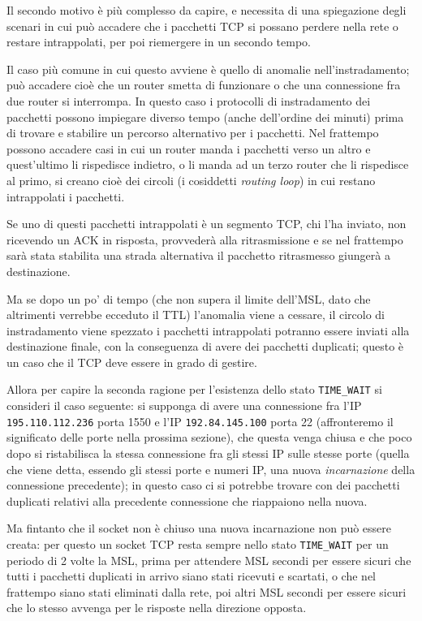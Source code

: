 Il secondo motivo è più complesso da capire, e necessita di una spiegazione
degli scenari in cui può accadere che i pacchetti TCP si possano perdere nella
rete o restare intrappolati, per poi riemergere in un secondo tempo. 

Il caso più comune in cui questo avviene è quello di anomalie
nell'instradamento; può accadere cioè che un router smetta di funzionare o che
una connessione fra due router si interrompa. In questo caso i protocolli di
instradamento dei pacchetti possono impiegare diverso tempo (anche dell'ordine
dei minuti) prima di trovare e stabilire un percorso alternativo per i
pacchetti. Nel frattempo possono accadere casi in cui un router manda i
pacchetti verso un altro e quest'ultimo li rispedisce indietro, o li manda ad
un terzo router che li rispedisce al primo, si creano cioè dei circoli (i
cosiddetti \textit{routing loop}) in cui restano intrappolati i pacchetti.

Se uno di questi pacchetti intrappolati è un segmento TCP, chi l'ha inviato,
non ricevendo un ACK in risposta, provvederà alla ritrasmissione e se nel
frattempo sarà stata stabilita una strada alternativa il pacchetto ritrasmesso
giungerà a destinazione.

Ma se dopo un po' di tempo (che non supera il limite dell'MSL, dato che
altrimenti verrebbe ecceduto il TTL) l'anomalia viene a cessare, il circolo di
instradamento viene spezzato i pacchetti intrappolati potranno essere inviati
alla destinazione finale, con la conseguenza di avere dei pacchetti duplicati;
questo è un caso che il TCP deve essere in grado di gestire.

Allora per capire la seconda ragione per l'esistenza dello stato
\texttt{TIME\_WAIT} si consideri il caso seguente: si supponga di avere una
connessione fra l'IP \texttt{195.110.112.236} porta 1550 e l'IP
\texttt{192.84.145.100} porta 22 (affronteremo il significato delle porte
nella prossima sezione), che questa venga chiusa e che poco dopo si
ristabilisca la stessa connessione fra gli stessi IP sulle stesse porte
(quella che viene detta, essendo gli stessi porte e numeri IP, una nuova
\textsl{incarnazione} della connessione precedente); in questo caso ci si
potrebbe trovare con dei pacchetti duplicati relativi alla precedente
connessione che riappaiono nella nuova.

Ma fintanto che il socket non è chiuso una nuova incarnazione non può essere
creata: per questo un socket TCP resta sempre nello stato \texttt{TIME\_WAIT}
per un periodo di 2 volte la MSL, prima per attendere MSL secondi per essere
sicuri che tutti i pacchetti duplicati in arrivo siano stati ricevuti e
scartati, o che nel frattempo siano stati eliminati dalla rete, poi altri MSL
secondi per essere sicuri che lo stesso avvenga per le risposte nella
direzione opposta.

